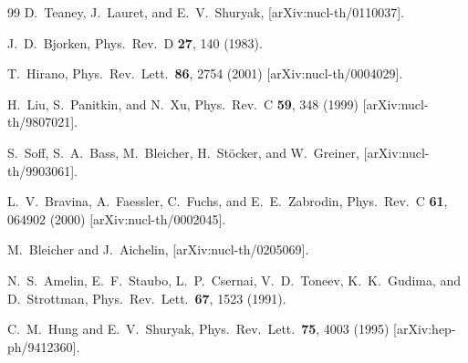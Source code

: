 \documentclass[aps,prc,superscriptaddress,showpacs,floatfix,nofootinbib]{revtex4}
\begin{document}
\begin{thebibliography}{99}
D.~Teaney, J.~Lauret, and E.~V.~Shuryak,
[arXiv:nucl-th/0110037].

J.~D.~Bjorken,
Phys.\ Rev.\ D {\bf 27}, 140 (1983).

T.~Hirano,
Phys.\ Rev.\ Lett.\  {\bf 86}, 2754 (2001)
[arXiv:nucl-th/0004029].

H.~Liu, S.~Panitkin, and N.~Xu,
Phys.\ Rev.\ C {\bf 59}, 348 (1999)
[arXiv:nucl-th/9807021].

S.~Soff, S.~A.~Bass, M.~Bleicher, H.~St\"ocker, and W.~Greiner,
[arXiv:nucl-th/9903061].

L.~V.~Bravina, A.~Faessler, C.~Fuchs, and E.~E.~Zabrodin,
Phys.\ Rev.\ C {\bf 61}, 064902 (2000)
[arXiv:nucl-th/0002045].

M.~Bleicher and J.~Aichelin,
[arXiv:nucl-th/0205069].

N.~S.~Amelin, E.~F.~Staubo, L.~P.~Csernai, V.~D.~Toneev, K.~K.~Gudima, 
  and D.~Strottman,
Phys.\ Rev.\ Lett.\  {\bf 67}, 1523 (1991).

C.~M.~Hung and E.~V.~Shuryak,
Phys.\ Rev.\ Lett.\  {\bf 75}, 4003 (1995)
[arXiv:hep-ph/9412360].


\end{thebibliography}
\end{document}

